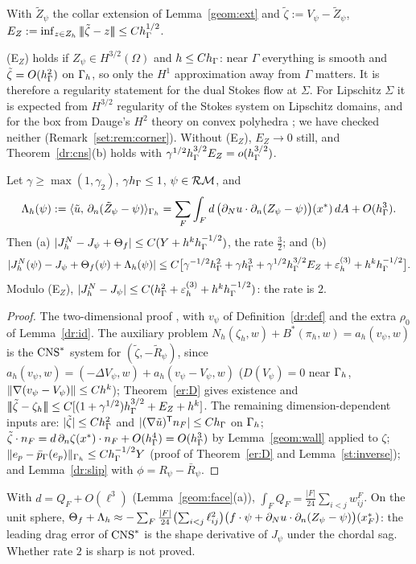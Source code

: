 \begin{assumption}[(E$_Z$)]\label{dr:EZ}
With $\tilde Z_\psi$ the collar extension of Lemma~\ref{geom:ext} and $\tilde\zeta:=V_\psi-\tilde Z_\psi$, $E_Z:=\inf_{z\in Z_h}|\!|\!|\tilde\zeta-z|\!|\!|\le Ch_\Gamma^{1/2}$.
\end{assumption}
(E$_Z$) holds if $Z_\psi\in H^{3/2}(\Omega)$ and $h\le Ch_\Gamma$: near $\Gamma$ everything is smooth and $\tilde\zeta=O(h_\Gamma^2)$ on $\Gamma_h$, so only the $H^1$ approximation away from $\Gamma$ matters. It is therefore a regularity statement for the dual Stokes flow at $\Sigma$. For Lipschitz $\Sigma$ it is expected from $H^{3/2}$ regularity of the Stokes system on Lipschitz domains, and for the box from Dauge's $H^2$ theory on convex polyhedra \cite{Dauge1989}; we have checked neither (Remark~\ref{set:rem:corner}). Without (E$_Z$), $E_Z\to0$ still, and Theorem~\ref{dr:cns}(b) holds with $\gamma^{1/2}h_\Gamma^{3/2}E_Z=o(h_\Gamma^{3/2})$.

\begin{theorem}\label{dr:cns}
Let $\gamma\ge\max(1,\gamma_2)$, $\gamma h_\Gamma\le1$, $\psi\in\mathcal{RM}$, and
\[
\Lambda_h(\psi):=\langle \tilde u,\, \partial_n(\tilde Z_\psi-\psi)\rangle_{\Gamma_h}=\sum_F\int_Fd\,\bigl(\partial_Nu\cdot\partial_n(Z_\psi-\psi)\bigr)(x^\ast)\,dA+O(h_\Gamma^3).
\]
Then (a) $|J^N_h-J_\psi+\Theta_f|\le C(Y+h^kh_\Gamma^{-1/2})$, the rate $\frac32$; and (b)
\[
|J^N_h(\psi)-J_\psi+\Theta_f(\psi)+\Lambda_h(\psi)|\le C\bigl[\gamma^{-1/2}h_\Gamma^2+\gamma h_\Gamma^3+\gamma^{1/2}h_\Gamma^{3/2}E_Z+\varepsilon_h^{(3)}+h^kh_\Gamma^{-1/2}\bigr].
\]
Modulo (E$_Z$), $|J^N_h-J_\psi|\le C(h_\Gamma^2+\varepsilon_h^{(3)}+h^kh_\Gamma^{-1/2})$: the rate is $2$.
\end{theorem}
\begin{proof}
The two-dimensional proof \cite{PadhiLong2D}, with $v_\psi$ of Definition~\ref{dr:def} and the extra $\rho_0$ of Lemma~\ref{dr:id}. The auxiliary problem $N_h(\zeta_h,w)+B^\ast(\pi_h,w)=a_h(v_\psi,w)$ is the $\mathrm{CNS}^\ast$ system for $(\tilde\zeta,-\tilde R_\psi)$, since $a_h(v_\psi,w)=(-\Delta V_\psi,w)+a_h(v_\psi-V_\psi,w)$ ($D(V_\psi)=0$ near $\Gamma_h$, $\lVert \nabla(v_\psi-V_\psi)\rVert\le Ch^k$); Theorem~\ref{er:D} gives existence and $|\!|\!|\tilde\zeta-\zeta_h|\!|\!|\le C[(1+\gamma^{1/2})h_\Gamma^{3/2}+E_Z+h^k]$. The remaining dimension-dependent inputs are: $|\tilde\zeta|\le Ch_\Gamma^2$ and $|(\nabla\tilde u)^{\mathsf T}n_F|\le Ch_\Gamma$ on $\Gamma_h$; $\tilde\zeta\cdot n_F=d\,\partial_n\zeta(x^\ast)\cdot n_F+O(h_\Gamma^4)=O(h_\Gamma^3)$ by Lemma~\ref{geom:wall} applied to $\zeta$; $\lVert e_p-\bar p_{\Gamma}(e_p)\rVert_{\Gamma_h}\le Ch_\Gamma^{-1/2}Y$ (proof of Theorem~\ref{er:D} and Lemma~\ref{st:inverse}); and Lemma~\ref{dr:slip} with $\phi=R_\psi-\bar R_\psi$.
\end{proof}
With $d=Q_F+O(\ell^3)$ (Lemma~\ref{geom:face}(a)), $\int_FQ_F=\frac{|F|}{24}\sum_{i<j}w^F_{ij}$. On the unit sphere, $\Theta_f+\Lambda_h\approx-\sum_F\frac{|F|}{24}\bigl(\sum_{i<j}\ell_{ij}^2\bigr)\bigl(f\cdot\psi+\partial_Nu\cdot\partial_n(Z_\psi-\psi)\bigr)(x^\ast_F)$: the leading drag error of $\mathrm{CNS}^\ast$ is the shape derivative of $J_\psi$ under the chordal sag. Whether rate $2$ is sharp is not proved.
